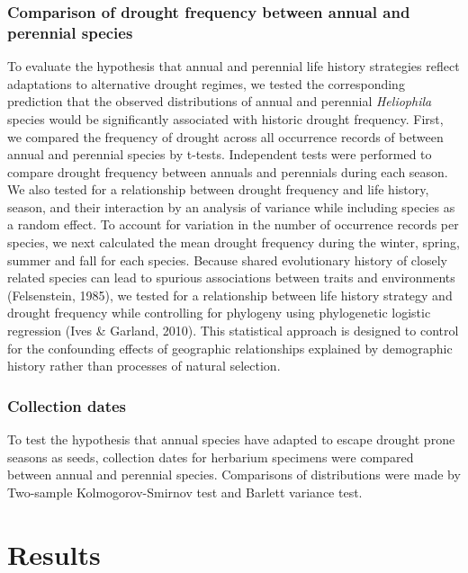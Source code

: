 \documentclass[man,floatsintext]{apa6}
\theoremstyle{definition}
\theoremstyle{definition}
\theoremstyle{definition}
\theoremstyle{remark}
\begin{document}
\hypertarget{comparison-of-drought-frequency-between-annual-and-perennial-species}{%
\subsubsection{Comparison of drought frequency between annual and
perennial
species}\label{comparison-of-drought-frequency-between-annual-and-perennial-species}}

To evaluate the hypothesis that annual and perennial life history
strategies reflect adaptations to alternative drought regimes, we tested
the corresponding prediction that the observed distributions of annual
and perennial \emph{Heliophila} species would be significantly
associated with historic drought frequency. First, we compared the
frequency of drought across all occurrence records of between annual and
perennial species by t-tests. Independent tests were performed to
compare drought frequency between annuals and perennials during each
season. We also tested for a relationship between drought frequency and
life history, season, and their interaction by an analysis of variance
while including species as a random effect. To account for variation in
the number of occurrence records per species, we next calculated the
mean drought frequency during the winter, spring, summer and fall for
each species. Because shared evolutionary history of closely related
species can lead to spurious associations between traits and
environments (Felsenstein, 1985), we tested for a relationship between
life history strategy and drought frequency while controlling for
phylogeny using phylogenetic logistic regression (Ives \& Garland,
2010). This statistical approach is designed to control for the
confounding effects of geographic relationships explained by demographic
history rather than processes of natural selection.

\hypertarget{collection-dates}{%
\subsubsection{Collection dates}\label{collection-dates}}

To test the hypothesis that annual species have adapted to escape
drought prone seasons as seeds, collection dates for herbarium specimens
were compared between annual and perennial species. Comparisons of
distributions were made by Two-sample Kolmogorov-Smirnov test and
Barlett variance test.

\hypertarget{results}{%
\section{Results}\label{results}}
\end{document}
